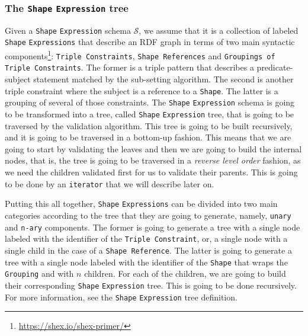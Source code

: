 \subsubsection{The \texttt{Shape} \texttt{Expression} tree}

Given a \texttt{Shape} \texttt{Expression} schema $\mathcal{S}$, we assume that it is a collection of labeled \texttt{Shape} \texttt{Expressions} that describe an RDF graph in terms of two main syntactic components\footnote{\url{https://shex.io/shex-primer/}}: \texttt{Triple Constraints}, \texttt{Shape References} and \texttt{Groupings of Triple Constraints}. The former is a triple pattern that describes a predicate-subject statement matched by the sub-setting algorithm. The second is another triple constraint where the subject is a reference to a \texttt{Shape}. The latter is a grouping of several of those constraints. The \texttt{Shape} \texttt{Expression} schema is going to be transformed into a tree, called \texttt{Shape} \texttt{Expression} tree, that is going to be traversed by the validation algorithm. This tree is going to be built recursively, and it is going to be traversed in a bottom-up fashion. This means that we are going to start by validating the leaves and then we are going to build the internal nodes, that is, the tree is going to be traversed in a \textit{reverse level order} fashion, as we need the children validated first for us to validate their parents. This is going to be done by an \texttt{iterator} that we will describe later on.

Putting this all together, \texttt{Shape} \texttt{Expressions} can be divided into two main categories according to the tree that they are going to generate, namely, \texttt{unary} and \texttt{n-ary} components. The former is going to generate a tree with a single node labeled with the identifier of the \texttt{Triple Constraint}, or, a single node with a single child in the case of a \texttt{Shape Reference}. The latter is going to generate a tree with a single node labeled with the identifier of the \texttt{Shape} that wraps the \texttt{Grouping} and with $n$ children. For each of the children, we are going to build their corresponding \texttt{Shape} \texttt{Expression} tree. This is going to be done recursively. For more information, see the \texttt{Shape} \texttt{Expression} tree definition.

